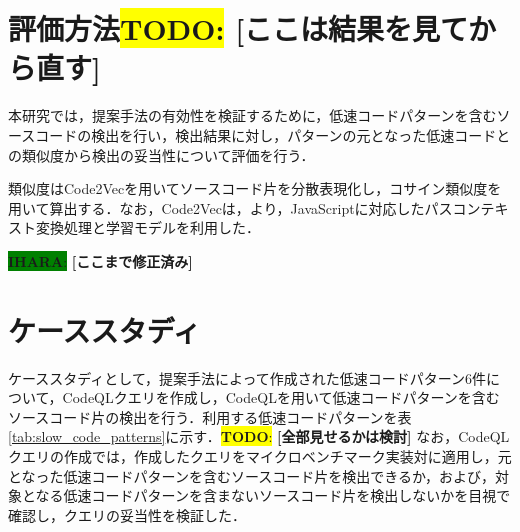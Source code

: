 \documentclass[submit,techrep,noauthor]{ipsj}
\newcommand{\todo}[1]{\colorbox{yellow}{{\bf TODO}:}{\color{red} {\textbf{[#1]}}}}
\newcommand{\ihara}[1]{\colorbox{green}{{\bf IHARA}:}{\color{blue} {\textbf{[#1]}}}}
\begin{document}
\section{評価方法\todo{ここは結果を見てから直す}}
\label{sec:evaluation}

本研究では，提案手法の有効性を検証するために，低速コードパターンを含むソースコードの検出を行い，検出結果に対し，パターンの元となった低速コードとの類似度から検出の妥当性について評価を行う．

類似度はCode2Vec\cite{code2vec}を用いてソースコード片を分散表現化し，コサイン類似度を用いて算出する．なお，Code2Vecは，\cite{saiki}より，JavaScriptに対応したパスコンテキスト変換処理と学習モデルを利用した．



\ihara{ここまで修正済み}

\section{ケーススタディ}
\label{sec:case-study}

ケーススタディとして，提案手法によって作成された低速コードパターン6件について，CodeQLクエリを作成し，CodeQLを用いて低速コードパターンを含むソースコード片の検出を行う．利用する低速コードパターンを表\ref{tab:slow_code_patterns}に示す．\todo{全部見せるかは検討}
なお，CodeQLクエリの作成では，作成したクエリをマイクロベンチマーク実装対に適用し，元となった低速コードパターンを含むソースコード片を検出できるか，および，対象となる低速コードパターンを含まないソースコード片を検出しないかを目視で確認し，クエリの妥当性を検証した．
\end{document}
